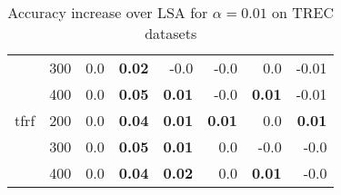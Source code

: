 \begin{table}[H]
\begin{center}
\begin{tabular}{ll|rrrrrr}
   & 300 &       0.0 &  \textbf{0.02} &       -0.0 &      -0.0 &       0.0 &      -0.01 \\
   & 400 &       0.0 &  \textbf{0.05} &  \textbf{0.01} &      -0.0 &  \textbf{0.01} &      -0.01 \\
tfrf & 200 &       0.0 &  \textbf{0.04} &  \textbf{0.01} &  \textbf{0.01} &       0.0 &  \textbf{0.01} \\
   & 300 &       0.0 &  \textbf{0.05} &  \textbf{0.01} &       0.0 &      -0.0 &      -0.0 \\
   & 400 &       0.0 &  \textbf{0.04} &  \textbf{0.02} &       0.0 &  \textbf{0.01} &      -0.0 \\
\bottomrule
\end{tabular}

\caption[Accuracy increase over LSA for $\alpha=0.01$ on TREC datasets]{Accuracy increase over LSA for $\alpha=0.01$ on TREC datasets}
\label{tab:batch:results:trec0.01}
\end{center}
\end{table}


